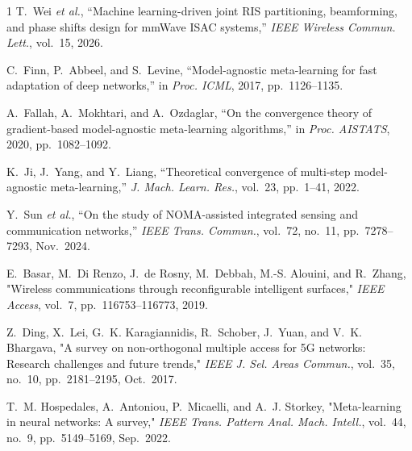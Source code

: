 \documentclass[10pt,journal]{IEEEtran}
\begin{document}
\begin{thebibliography}{1}
T.~Wei \emph{et al.}, ``Machine learning-driven joint RIS partitioning,
beamforming, and phase shifts design for mmWave ISAC systems,'' \emph{IEEE
Wireless Commun. Lett.}, vol.~15, 2026.

C.~Finn, P.~Abbeel, and S.~Levine, ``Model-agnostic meta-learning for fast
adaptation of deep networks,'' in \emph{Proc. ICML}, 2017, pp.~1126--1135.

A.~Fallah, A.~Mokhtari, and A.~Ozdaglar, ``On the convergence theory of
gradient-based model-agnostic meta-learning algorithms,'' in \emph{Proc.
AISTATS}, 2020, pp.~1082--1092.

K.~Ji, J.~Yang, and Y.~Liang, ``Theoretical convergence of multi-step
model-agnostic meta-learning,'' \emph{J. Mach. Learn. Res.}, vol.~23, pp.~1--41,
2022.

Y.~Sun \emph{et al.}, ``On the study of NOMA-assisted integrated sensing and
communication networks,'' \emph{IEEE Trans. Commun.}, vol.~72, no.~11,
pp.~7278--7293, Nov.~2024.

E.~Basar, M.~Di Renzo, J.~de Rosny, M.~Debbah, M.-S. Alouini, and R.~Zhang,
"Wireless communications through reconfigurable intelligent surfaces,"
\emph{IEEE Access}, vol.~7, pp.~116753--116773, 2019.

Z.~Ding, X.~Lei, G.~K. Karagiannidis, R.~Schober, J.~Yuan, and V.~K. Bhargava,
"A survey on non-orthogonal multiple access for 5G networks: Research
challenges and future trends," \emph{IEEE J. Sel. Areas Commun.}, vol.~35,
no.~10, pp.~2181--2195, Oct.~2017.

T.~M. Hospedales, A.~Antoniou, P.~Micaelli, and A.~J. Storkey,
"Meta-learning in neural networks: A survey," \emph{IEEE Trans. Pattern Anal.
Mach. Intell.}, vol.~44, no.~9, pp.~5149--5169, Sep.~2022.

\end{thebibliography}
\end{document}
